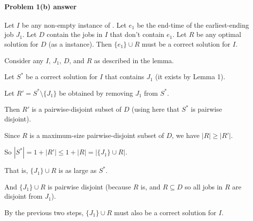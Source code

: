 
\paragraph{Problem 1(b) answer} 

\begin{lemma}
  Let $I$ be any non-empty instance of .
  Let $e_1$ be the end-time of the earliest-ending job $J_1$.
  Let $D$ contain the jobs in $I$ that don't contain $e_1$.
  Let $R$ be any optimal solution for $D$ (as a  instance).
  Then $\{e_1\}\cup R$ must be a correct solution for $I$.
\end{lemma}


\begin{blue}
  
  \begin{longFormProof}

    \step Consider any $I$, $J_1$, $D$, and $R$ as described in the lemma.

    \step Let $S^*$ be a correct solution for $I$ that contains $J_1$ (it exists by Lemma 1).

    \step Let $R' = S^*\setminus \{J_1\}$ be obtained by removing $J_1$ from $S^*$.

    \step Then $R'$ is a pairwise-disjoint subset of $D$ (using here that $S^*$ is pairwise disjoint).

    \step Since $R$ is a maximum-size pairwise-disjoint subset of $D$, we have $|R| \ge |R'|$.

    \step So \( |S^*| = 1 + |R'| \le 1+|R| = |\{J_1\} \cup R|\).

    \step That is, $\{J_1\} \cup R$ is as large as $S^*$.

    \step And $\{J_1\} \cup R$ is pairwise disjoint (because $R$ is, and $R\subseteq D$ so all jobs in $R$ are disjoint from $J_1$).

    \step By the previous two steps, $\{J_1\}\cup R$ must also be a correct solution for $I$.

  \end{longFormProof}

\end{blue}

